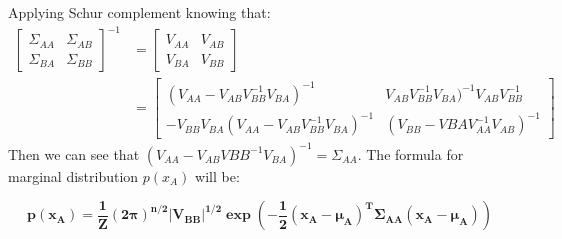 \documentclass[a4paper, 10pt]{article}  %
\begin{document}
\begin{enumerate}[label=\textbf{(\alph*)}]
    Applying Schur complement knowing that:
    \begin{align*}
        \left[ \begin{array}{cc}
            \Sigma_{AA} & \Sigma_{AB} \\
            \Sigma_{BA} & \Sigma_{BB}
        \end{array} \right]^{-1} 
        & = \left[ \begin{array}{cc}
        V_{AA} & V_{AB} \\
        V_{BA} & V_{BB} \end{array} \right] \\
        &= \left[ \begin{array}{cc}
            (V_{AA} - V_{AB} V_{BB}^{-1} V_{BA})^{-1} &  V_{AB} V_{BB}^{-1} V_{BA})^{-1} V_{AB} V_{BB}^{-1}\\
            - V_{BB} V_{BA}(V_{AA} - V_{AB} V_{BB}^{-1} V_{BA})^{-1} & (V_{BB} - V{BA} V_{AA}^{-1}V_{AB})^{-1}
        \end{array} \right]
    \end{align*}
    Then we can see that \((V_{AA} - V_{AB} V{BB}^{-1} V_{BA})^{-1} = \Sigma_{AA}\). The formula for marginal distribution $p(x_A)$ will be:
    
    \[\mathbf{p(x_A) = \frac{1}{Z} (2 \pi)^{n/2} |V_{BB}|^{1/2} \exp \left( -\frac{1}{2}(x_A - \mu_A)^T \Sigma_{AA} (x_A - \mu_A)\right)} \]
    

\end{enumerate}
\end{document}
